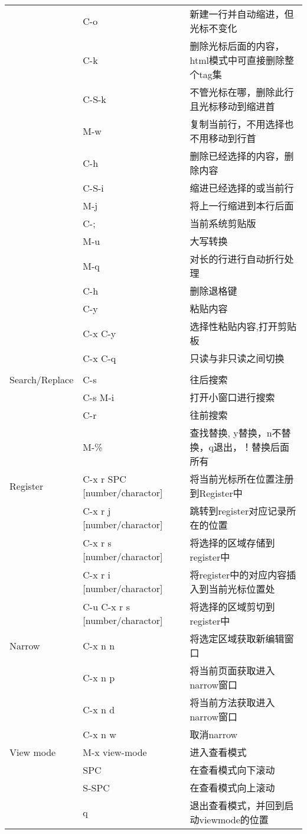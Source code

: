 \documentclass[10pt,a4paper]{article}
\begin{document}
\begin{center}
\begin{tabular}{lll}
 & C-o & 新建一行并自动缩进，但光标不变化\\
 & C-k & 删除光标后面的内容，html模式中可直接删除整个tag集\\
 & C-S-k & 不管光标在哪，删除此行且光标移动到缩进首\\
 & M-w & 复制当前行，不用选择也不用移动到行首\\
 & C-h & 删除已经选择的内容，删除内容\\
 & C-S-i & 缩进已经选择的或当前行\\
 & M-j & 将上一行缩进到本行后面\\
 & C-; & 当前系统剪贴版\\
 & M-u & 大写转换\\
 & M-q & 对长的行进行自动折行处理\\
 & C-h & 删除退格键\\
 & C-y & 粘贴内容\\
 & C-x C-y & 选择性粘贴内容,打开剪贴板\\
 & C-x C-q & 只读与非只读之间切换\\
 &  & \\
\hline
Search/Replace & C-s & 往后搜索\\
 & C-s M-i & 打开小窗口进行搜索\\
 & C-r & 往前搜索\\
 & M-\% & 查找替换, y替换，n不替换，q退出，！替换后面所有\\
\hline
Register & C-x r SPC [number/charactor] & 将当前光标所在位置注册到Register中\\
 & C-x r j [number/charactor] & 跳转到register对应记录所在的位置\\
 & C-x r s [number/charactor] & 将选择的区域存储到register中\\
 & C-x r i [number/charactor] & 将register中的对应内容插入到当前光标位置处\\
 & C-u C-x r s [number/charactor] & 将选择的区域剪切到register中\\
\hline
Narrow & C-x n n & 将选定区域获取新编辑窗口\\
 & C-x n p & 将当前页面获取进入narrow窗口\\
 & C-x n d & 将当前方法获取进入narrow窗口\\
 & C-x n w & 取消narrow\\
\hline
View mode & M-x view-mode & 进入查看模式\\
 & SPC & 在查看模式向下滚动\\
 & S-SPC & 在查看模式向上滚动\\
 & q & 退出查看模式，并回到启动viewmode的位置\\

\end{tabular}
\end{center}
\end{document}
